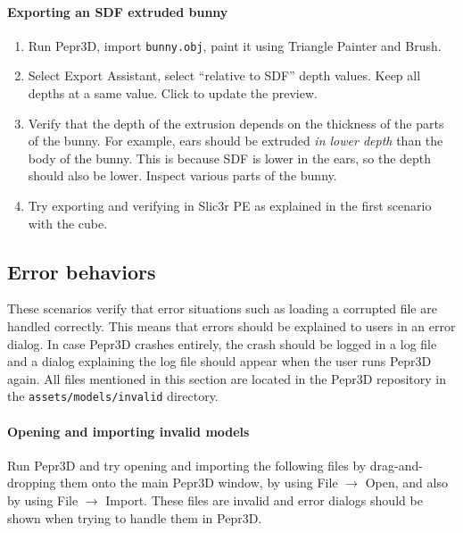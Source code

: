 \paragraph{Exporting an SDF extruded bunny}

\begin{enumerate}
\item Run Pepr3D, import \texttt{bunny.obj}, paint it using Triangle Painter and Brush.
\item Select Export Assistant, select ``relative to SDF'' depth values. Keep all depths at a same value. Click to update the preview.
\item Verify that the depth of the extrusion depends on the thickness of the parts of the bunny. For example, ears should be extruded \emph{in lower depth} than the body of the bunny. This is because SDF is lower in the ears, so the depth should also be lower. Inspect various parts of the bunny.
\item Try exporting and verifying in Slic3r PE as explained in the first scenario with the cube.
\end{enumerate}

\subsection{Error behaviors}

These scenarios verify that error situations such as loading a corrupted file are handled correctly.
This means that errors should be explained to users in an error dialog.
In case Pepr3D crashes entirely, the crash should be logged in a log file and a dialog explaining the log file should appear when the user runs Pepr3D again.
All files mentioned in this section are located in the Pepr3D repository in the \texttt{assets/models/invalid} directory.

\paragraph{Opening and importing invalid models}
Run Pepr3D and try opening and importing the following files by drag-and-dropping them onto the main Pepr3D window, by using File $\rightarrow$ Open, and also by using File $\rightarrow$ Import.
These files are invalid and error dialogs should be shown when trying to handle them in Pepr3D.

